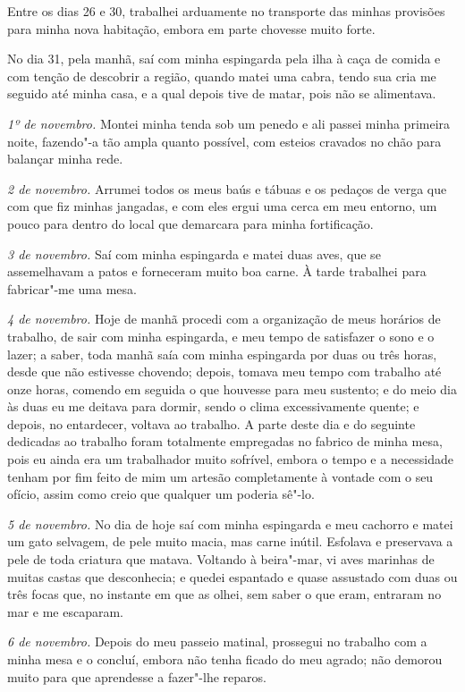 Entre os dias 26 e 30, trabalhei arduamente no transporte das minhas
provisões para minha nova habitação, embora em parte chovesse muito
forte.

No dia 31, pela manhã, saí com minha espingarda pela ilha à caça de
comida e com tenção de descobrir a região, quando matei uma cabra, tendo
sua cria me seguido até minha casa, e a qual depois tive de matar, pois
não se alimentava.

\emph{1º de novembro.} Montei minha tenda sob um penedo e ali passei
minha primeira noite, fazendo"-a tão ampla quanto possível, com esteios
cravados no chão para balançar minha rede.

\emph{2 de novembro.} Arrumei todos os meus baús e tábuas e os pedaços
de verga que com que fiz minhas jangadas, e com eles ergui uma cerca em
meu entorno, um pouco para dentro do local que demarcara para minha
fortificação.

\emph{3 de novembro.} Saí com minha espingarda e matei duas aves, que se
assemelhavam a patos e forneceram muito boa carne. À tarde trabalhei
para fabricar"-me uma mesa.

\emph{4 de novembro.} Hoje de manhã procedi com a organização de meus
horários de trabalho, de sair com minha espingarda, e meu tempo de
satisfazer o sono e o lazer; a saber, toda manhã saía com minha
espingarda por duas ou três horas, desde que não estivesse chovendo;
depois, tomava meu tempo com trabalho até onze horas, comendo em seguida
o que houvesse para meu sustento; e do meio dia às duas eu me deitava
para dormir, sendo o clima excessivamente quente; e depois, no
entardecer, voltava ao trabalho. A parte deste dia e do seguinte
dedicadas ao trabalho foram totalmente empregadas no fabrico de minha
mesa, pois eu ainda era um trabalhador muito sofrível, embora o tempo e
a necessidade tenham por fim feito de mim um artesão completamente à
vontade com o seu ofício, assim como creio que qualquer um poderia
sê"-lo.

\emph{5 de novembro.} No dia de hoje saí com minha espingarda e meu
cachorro e matei um gato selvagem, de pele muito macia, mas carne
inútil. Esfolava e preservava a pele de toda criatura que matava.
Voltando à beira"-mar, vi aves marinhas de muitas castas que desconhecia;
e quedei espantado e quase assustado com duas ou três focas que, no
instante em que as olhei, sem saber o que eram, entraram no mar e me
escaparam.

\emph{6 de novembro.} Depois do meu passeio matinal, prossegui no
trabalho com a minha mesa e o concluí, embora não tenha ficado do meu
agrado; não demorou muito para que aprendesse a fazer"-lhe reparos.

